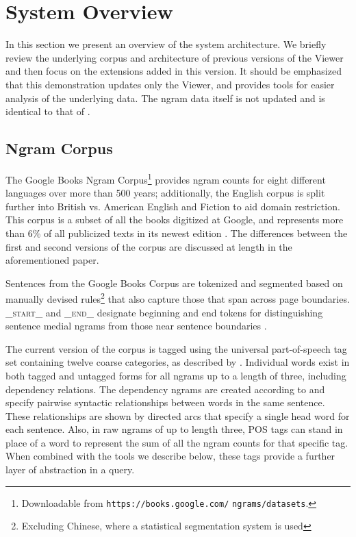\documentclass[11pt]{article}
\begin{document}
\section{System Overview}
\label{sec:overview}

In this section we present an overview of the system architecture. We briefly review the underlying corpus and architecture of previous versions of the Viewer \cite{culturomics,lin2012syntactic} and then focus on the extensions added in this version. It should be emphasized that this demonstration updates only the Viewer, and provides tools for easier analysis of the underlying data. The ngram data itself is not updated and is identical to that of .


\subsection{Ngram Corpus}
	The Google Books Ngram Corpus\footnote{Downloadable from \texttt{https://books.google.com/} \texttt{ngrams/datasets}.} provides ngram counts for eight different languages over more than 500 years; additionally, the English corpus is split further into British vs. American English and Fiction to aid domain restriction. This corpus is a subset of all the books digitized at Google, and represents more than 6\% of all publicized texts in its newest edition \cite{lin2012syntactic}. The differences between the first and second versions of the corpus are discussed at length in the aforementioned paper.
	

Sentences from the Google Books Corpus are tokenized and segmented based on manually devised rules\footnote{Excluding Chinese, where a statistical segmentation system is used} that also capture those that span across page boundaries. \textsf{\textsc{\_start\_}} and \textsf{\textsc{\_end\_}} designate beginning and end tokens for distinguishing sentence medial ngrams from those near sentence boundaries \cite{lin2012syntactic}.

The current version of the corpus is tagged using the universal part-of-speech tag set containing twelve coarse categories, as described by . Individual words exist in both tagged and untagged forms for all ngrams up to a length of three, including dependency relations. The dependency ngrams are created according to  and specify pairwise syntactic relationships between words in the same sentence. These relationships are shown by directed arcs that specify a single head word for each sentence. Also, in raw ngrams of up to length three, POS tags can stand in place of a word to represent the sum of all the ngram counts for that specific tag. When combined with the tools we describe below, these tags provide a further layer of abstraction in a query.
\end{document}
